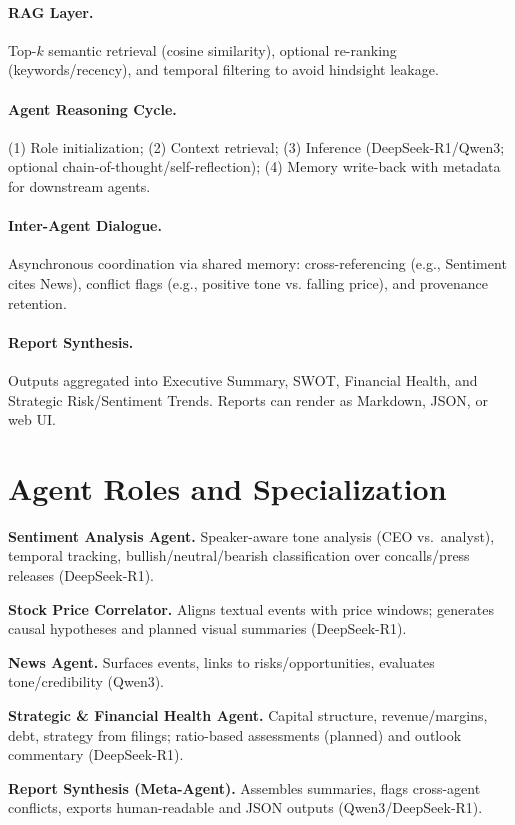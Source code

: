 \documentclass[11pt]{article}
\begin{document}
\paragraph{RAG Layer.}
Top-$k$ semantic retrieval (cosine similarity), optional re-ranking (keywords/recency), and temporal filtering to avoid hindsight leakage.

\paragraph{Agent Reasoning Cycle.}
(1) Role initialization; (2) Context retrieval; (3) Inference (DeepSeek-R1/Qwen3; optional chain-of-thought/self-reflection); (4) Memory write-back with metadata for downstream agents.

\paragraph{Inter-Agent Dialogue.}
Asynchronous coordination via shared memory: cross-referencing (e.g., Sentiment cites News), conflict flags (e.g., positive tone vs. falling price), and provenance retention.

\paragraph{Report Synthesis.}
Outputs aggregated into Executive Summary, SWOT, Financial Health, and Strategic Risk/Sentiment Trends. Reports can render as Markdown, JSON, or web UI.

\section{Agent Roles and Specialization}
\label{sec:agents}
\textbf{Sentiment Analysis Agent.} Speaker-aware tone analysis (CEO vs.\ analyst), temporal tracking, bullish/neutral/bearish classification over concalls/press releases (DeepSeek-R1).

\textbf{Stock Price Correlator.} Aligns textual events with price windows; generates causal hypotheses and planned visual summaries (DeepSeek-R1).

\textbf{News Agent.} Surfaces events, links to risks/opportunities, evaluates tone/credibility (Qwen3).

\textbf{Strategic \& Financial Health Agent.} Capital structure, revenue/margins, debt, strategy from filings; ratio-based assessments (planned) and outlook commentary (DeepSeek-R1).

\textbf{Report Synthesis (Meta-Agent).} Assembles summaries, flags cross-agent conflicts, exports human-readable and JSON outputs (Qwen3/DeepSeek-R1).
\end{document}
